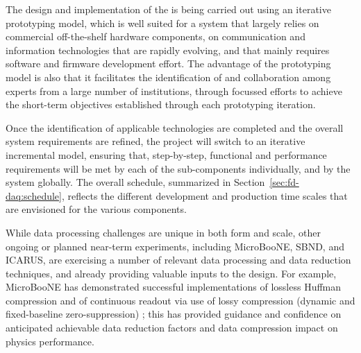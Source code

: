 
The design and implementation of the  is being carried out using an iterative prototyping model, which is well suited for a system that largely relies on commercial off-the-shelf hardware components, on communication and information technologies that are rapidly evolving, and that mainly requires software and firmware development effort.
The advantage of the prototyping model is also that it facilitates the identification of and collaboration among experts from a large number of institutions, through focussed efforts to achieve the short-term objectives established through each prototyping iteration.

Once the identification of applicable technologies are completed and the overall system requirements are refined, the project will switch to an iterative incremental model, ensuring that, step-by-step, functional and performance requirements will be met by each of the sub-components individually, and by the  system globally.
The overall schedule, summarized in Section~\ref{sec:fd-daq:schedule},
reflects the different development and production time scales that are
envisioned for the various  components.

While  data processing challenges are unique in both form
and scale, other ongoing or planned near-term 
experiments, including MicroBooNE, SBND, and ICARUS, are exercising
a number of relevant data processing and data reduction techniques, and already providing valuable
inputs to the   design. For example,
MicroBooNE has demonstrated successful implementations of lossless Huffman
compression and of continuous readout via use of lossy compression
(dynamic and fixed-baseline zero-suppression)
\cite{bib:uBsnreadout2019}; this has provided guidance and 
confidence on anticipated achievable data reduction factors and data compression
impact on physics performance.

